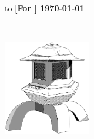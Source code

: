 \begin{titlepage}
\null\vskip-47pt
\hbox to \textwidth
{\bf [For \holn{} \holnversion] { \hfil \today}}

\setcounter{page}{1}                      %

\vspace*{60mm}


{\selectfont
\begin{center}
 \\
\end{center}}

\begin{center}
\includegraphics[width=3.8cm]{../Logo/lantern}
\end{center}


\vfill
\end{titlepage}

\thispagestyle{empty}
\cleardoublepage






